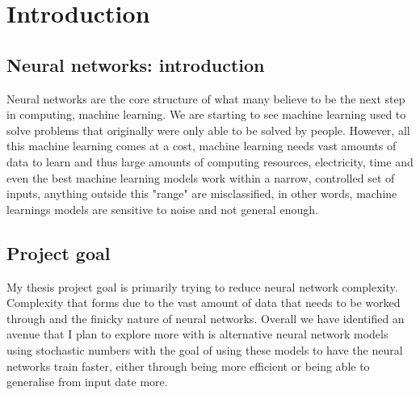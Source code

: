 \documentclass[a4paper,oneside,phd,etd]{BYUPhys}
\begin{document}
 \frontmatter


 \makepreliminarypages


\doublespace
%

%

 \clearemptydoublepage
\singlespace
 \tableofcontents

\clearemptydoublepage
\listoffigures

\clearemptydoublepage

\clearemptydoublepage

\mainmatter
%
\chapter{Introduction}
\label{chap:Introduction}


\section{Neural networks: introduction}
Neural networks are the core structure of what many believe to be the next step in computing, machine learning. We are starting to see machine learning used to solve problems that originally were only able to be solved by people. However, all this machine learning comes at a cost, machine learning needs vast amounts of data to learn and thus large amounts of computing resources, electricity, time and even the best machine learning models work within a narrow, controlled set of inputs, anything outside this "range" are misclassified, in other words, machine learnings models are sensitive to noise and not general enough.

\section{Project goal}
My thesis project goal is primarily trying to reduce neural network complexity. Complexity that forms due to the vast amount of data that needs to be worked through and the finicky nature of neural networks. Overall we have identified an avenue that I plan to explore more with is alternative neural network models using stochastic numbers with the goal of using these models to have the neural networks train faster, either through being more efficient or being able to generalise from input date more.
\end{document}
